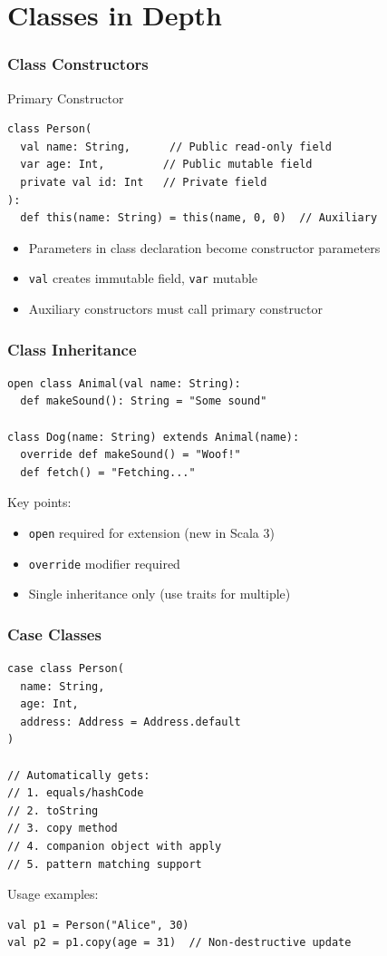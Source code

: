 \documentclass{beamer}
\begin{document}
\section{Classes in Depth}
\begin{frame}[fragile]
\frametitle{Class Constructors}
\begin{block}{Primary Constructor}
\begin{lstlisting}[style=scala]
class Person(
  val name: String,      // Public read-only field
  var age: Int,         // Public mutable field
  private val id: Int   // Private field
):
  def this(name: String) = this(name, 0, 0)  // Auxiliary
\end{lstlisting}
\end{block}

\begin{itemize}
\item Parameters in class declaration become constructor parameters
\item \texttt{val} creates immutable field, \texttt{var} mutable
\item Auxiliary constructors must call primary constructor
\end{itemize}
\end{frame}

\begin{frame}[fragile]
\frametitle{Class Inheritance}
\begin{lstlisting}[style=scala]
open class Animal(val name: String):
  def makeSound(): String = "Some sound"

class Dog(name: String) extends Animal(name):
  override def makeSound() = "Woof!"
  def fetch() = "Fetching..."
\end{lstlisting}

Key points:
\begin{itemize}
\item \texttt{open} required for extension (new in Scala 3)
\item \texttt{override} modifier required
\item Single inheritance only (use traits for multiple)
\end{itemize}
\end{frame}

\begin{frame}[fragile]
\frametitle{Case Classes}
\begin{lstlisting}[style=scala]
case class Person(
  name: String,
  age: Int,
  address: Address = Address.default
)

// Automatically gets:
// 1. equals/hashCode
// 2. toString
// 3. copy method
// 4. companion object with apply
// 5. pattern matching support
\end{lstlisting}

Usage examples:
\begin{lstlisting}[style=scala]
val p1 = Person("Alice", 30)
val p2 = p1.copy(age = 31)  // Non-destructive update
\end{lstlisting}
\end{frame}
\end{document}
